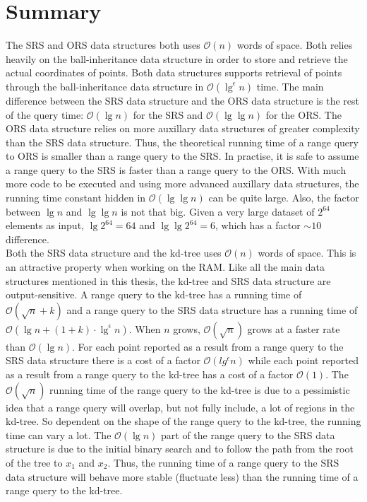 \section{Summary}
\label{sect:summaryprim}

The SRS and ORS data structures both uses $\mathcal{O}(n)$ words of space. Both relies heavily on the ball-inheritance data structure in order to store and retrieve the actual coordinates of points. Both data structures supports retrieval of points through the ball-inheritance data structure in $\mathcal{O}(\lg^\epsilon n)$ time. The main difference between the SRS data structure and the ORS data structure is the rest of the query time: $\mathcal{O}(\lg n)$ for the SRS and $\mathcal{O}(\lg \lg n)$ for the ORS. The ORS data structure relies on more auxillary data structures of greater complexity than the SRS data structure. Thus, the theoretical running time of a range query to ORS is smaller than a range query to the SRS. In practise, it is safe to assume a range query to the SRS is faster than a range query to the ORS. With much more code to be executed and using more advanced auxillary data structures, the running time constant hidden in $\mathcal{O}(\lg \lg n)$ can be quite large. Also,  the factor between $\lg n$ and $\lg \lg n$ is not that big. Given a very large dataset of $2^{64}$ elements as input, $\lg 2^{64} = 64$ and $\lg \lg 2^{64} = 6$, which has a factor $\sim10$ difference. \\


Both the SRS data structure and the kd-tree uses $\mathcal{O}(n)$ words of space. This is an attractive property when working on the RAM. Like all the main data structures mentioned in this thesis, the kd-tree and SRS data structure are output-sensitive. A range query to the kd-tree has a running time of $\mathcal{O}(\sqrt{n}+k)$ and a range query to the SRS data structure has a running time of $\mathcal{O}(\lg n + (1+k)\cdot\lg^\epsilon n)$. When $n$ grows, $\mathcal{O}(\sqrt{n})$ grows at a faster rate than $\mathcal{O}(\lg n)$. For each point reported as a result from a range query to the SRS data structure there is a cost of a factor $\mathcal{O}(lg^\epsilon n)$ while each point reported as a result from a range query to the kd-tree has a cost of a factor $\mathcal{O}(1)$. The $\mathcal{O}(\sqrt{n})$ running time of the range query to the kd-tree is due to a pessimistic idea that a range query will overlap, but not fully include, a lot of regions in the kd-tree. So dependent on the shape of the range query to the kd-tree, the running time can vary a lot. The $\mathcal{O}(\lg n)$ part of the range query to the SRS data structure is due to the initial binary search and to follow the path from the root of the tree to $x_1$ and $x_2$. Thus, the running time of a range query to the SRS data structure will behave more stable (fluctuate less) than the running time of a range query to the kd-tree. 


